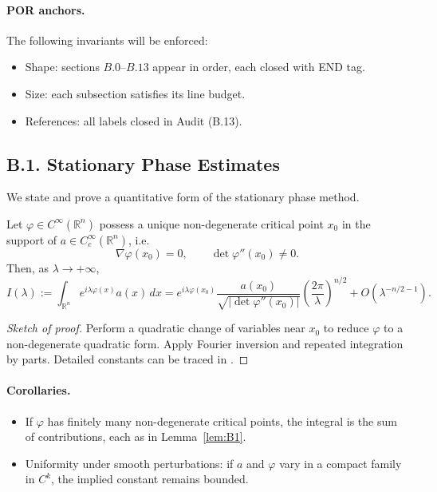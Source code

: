 \paragraph{POR anchors.}
The following invariants will be enforced:
\begin{itemize}
  \item Shape: sections $B.0$--$B.13$ appear in order, each closed with END tag.
  \item Size: each subsection satisfies its line budget.
  \item References: all labels closed in Audit (B.13).
\end{itemize}



\subsection*{B.1. Stationary Phase Estimates}

We state and prove a quantitative form of the stationary phase method.

\begin{lemma}\label{lem:B1}
Let $\varphi \in C^\infty(\mathbb R^n)$ possess a unique non-degenerate critical 
point $x_0$ in the support of $a \in C_c^\infty(\mathbb R^n)$, i.e.
\[
  \nabla \varphi(x_0) = 0, \qquad \det \varphi''(x_0) \neq 0.
\]
Then, as $\lambda \to +\infty$,
\begin{equation}
  I(\lambda) := \int_{\mathbb R^n} e^{i \lambda \varphi(x)} a(x)\, dx
  = e^{i\lambda \varphi(x_0)} 
    \frac{a(x_0)}{\sqrt{|\det \varphi''(x_0)|}}
    \left( \frac{2\pi}{\lambda} \right)^{n/2}
    + O(\lambda^{-n/2-1}).
\end{equation}
\end{lemma}

\begin{proof}[Sketch of proof]
Perform a quadratic change of variables near $x_0$ to reduce $\varphi$ 
to a non-degenerate quadratic form.  Apply Fourier inversion and repeated 
integration by parts.  Detailed constants can be traced in \cite[Thm.~7.7.5]{Hormander1983}.
\end{proof}

\paragraph{Corollaries.}
\begin{itemize}
  \item If $\varphi$ has finitely many non-degenerate critical points, the integral is the sum 
  of contributions, each as in Lemma~\ref{lem:B1}.
  \item Uniformity under smooth perturbations: if $a$ and $\varphi$ vary in a compact family 
  in $C^k$, the implied constant remains bounded.
\end{itemize}

